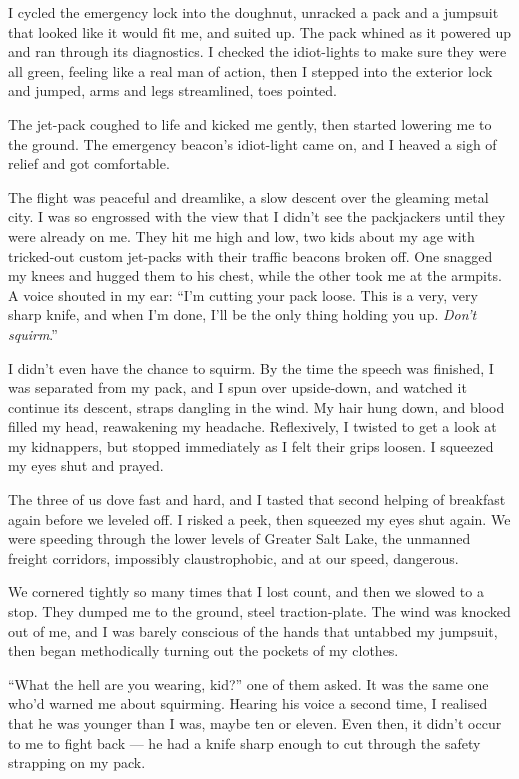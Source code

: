 I cycled the emergency lock into the doughnut, unracked a pack and
a jumpsuit that looked like it would fit me, and suited up. The
pack whined as it powered up and ran through its diagnostics. I
checked the idiot-lights to make sure they were all green, feeling
like a real man of action, then I stepped into the exterior lock
and jumped, arms and legs streamlined, toes pointed.

The jet-pack coughed to life and kicked me gently, then started
lowering me to the ground. The emergency beacon's idiot-light came
on, and I heaved a sigh of relief and got comfortable.

The flight was peaceful and dreamlike, a slow descent over the
gleaming metal city. I was so engrossed with the view that I didn't
see the packjackers until they were already on me. They hit me high
and low, two kids about my age with tricked-out custom jet-packs
with their traffic beacons broken off. One snagged my knees and
hugged them to his chest, while the other took me at the armpits. A
voice shouted in my ear:
``I'm cutting your pack loose. This is a very, very sharp knife, and when I'm 
done, I'll be the only thing holding you up. \emph{Don't squirm}.''

I didn't even have the chance to squirm. By the time the speech was
finished, I was separated from my pack, and I spun over
upside-down, and watched it continue its descent, straps dangling
in the wind. My hair hung down, and blood filled my head,
reawakening my headache. Reflexively, I twisted to get a look at my
kidnappers, but stopped immediately as I felt their grips loosen. I
squeezed my eyes shut and prayed.

The three of us dove fast and hard, and I tasted that second
helping of breakfast again before we leveled off. I risked a peek,
then squeezed my eyes shut again. We were speeding through the
lower levels of Greater Salt Lake, the unmanned freight corridors,
impossibly claustrophobic, and at our speed, dangerous.

We cornered tightly so many times that I lost count, and then we
slowed to a stop. They dumped me to the ground, steel
traction-plate. The wind was knocked out of me, and I was barely
conscious of the hands that untabbed my jumpsuit, then began
methodically turning out the pockets of my clothes.

``What the hell are you wearing, kid?'' one of them asked. It was
the same one who'd warned me about squirming. Hearing his voice a
second time, I realised that he was younger than I was, maybe ten
or eleven. Even then, it didn't occur to me to fight back --- he
had a knife sharp enough to cut through the safety strapping on my
pack.

